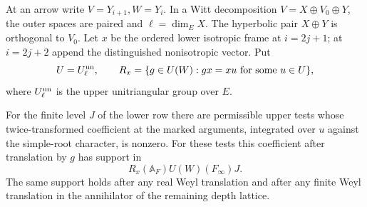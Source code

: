 \begin{auxlemma}\label{lem:fitted-marked-support}
At an arrow write \(V=Y_{i+1}, W=Y_i\). In a Witt decomposition
\(V=X\oplus V_0\oplus Y\), the outer spaces are paired and
\(\ell=\dim_E X\). The hyperbolic pair \(X\oplus Y\) is orthogonal to \(V_0\). Let \(x\) be the ordered lower isotropic frame at
\(i=2j+1\); at \(i=2j+2\) append the distinguished nonisotropic
vector. Put
\[
 U=U_\ell^{\rm un},\qquad
 R_x=\{g\in U(W):gx=xu\text{ for some }u\in U\},
\]
where \(U_\ell^{\rm un}\) is the upper unitriangular group over \(E\).

For the finite level \(J\) of the lower row there are permissible
upper tests whose twice-transformed coefficient at the marked
arguments, integrated over \(u\) against the simple-root character,
is nonzero. For these tests this coefficient after translation by
\(g\) has support in
\[
 R_x(\mathbb A_F) U(W)(F_\infty) J.
\]
The same support holds after any real Weyl translation and after any
finite Weyl translation in the annihilator of the remaining depth lattice.
\end{auxlemma}
